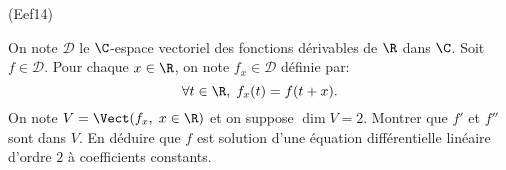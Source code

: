 \begin{tiny}(Eef14)\end{tiny} On note $\mathcal{D}$ le $\C$-espace vectoriel des fonctions dérivables de $\R$ dans $\C$. Soit $f\in \mathcal{D}$. Pour chaque $x\in \R$, on note $f_x \in \mathcal{D}$ définie par: 
\begin{displaymath}
  \forall t \in \R, \; f_x(t) = f(t+x).
\end{displaymath}
On note $V = \Vect(f_x,\; x\in \R)$ et on suppose $\dim V = 2$.\newline
Montrer que $f'$ et $f''$ sont dans $V$. En déduire que $f$ est solution d'une équation différentielle linéaire d'ordre $2$ à coefficients constants.
